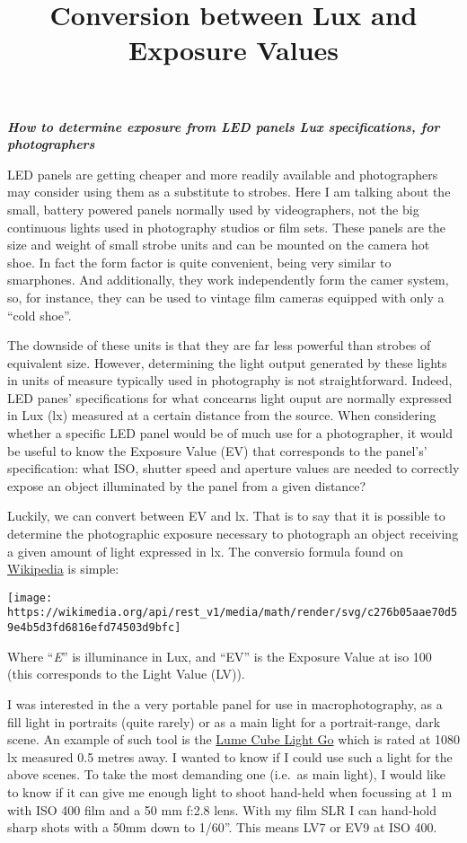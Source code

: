 \documentclass[
]{article}
\title{Conversion between Lux and Exposure Values}
\author{}
\date{\vspace{-2.5em}}
\begin{document}
\maketitle

\textbf{\emph{How to determine exposure from LED panels Lux
specifications, for photographers}}

LED panels are getting cheaper and more readily available and
photographers may consider using them as a substitute to strobes. Here I
am talking about the small, battery powered panels normally used by
videographers, not the big continuous lights used in photography studios
or film sets. These panels are the size and weight of small strobe units
and can be mounted on the camera hot shoe. In fact the form factor is
quite convenient, being very similar to smarphones. And additionally,
they work independently form the camer system, so, for instance, they
can be used to vintage film cameras equipped with only a ``cold shoe''.

The downside of these units is that they are far less powerful than
strobes of equivalent size. However, determining the light output
generated by these lights in units of measure typically used in
photography is not straightforward. Indeed, LED panes' specifications
for what concearns light ouput are normally expressed in Lux (lx)
measured at a certain distance from the source. When considering whether
a specific LED panel would be of much use for a photographer, it would
be useful to know the Exposure Value (EV) that corresponds to the
panel's' specification: what ISO, shutter speed and aperture values are
needed to correctly expose an object illuminated by the panel from a
given distance?

Luckily, we can convert between EV and lx. That is to say that it is
possible to determine the photographic exposure necessary to photograph
an object receiving a given amount of light expressed in lx. The
conversio formula found on
\href{http://en.wikipedia.org/wiki/Exposure_value\#EV_as_a_measure_of_luminance_and_illuminance}{Wikipedia}
is simple:

\texttt{[image: https://wikimedia.org/api/rest\_v1/media/math/render/svg/c276b05aae70d59e4b5d3fd6816efd74503d9bfc]}

Where ``\emph{E}'' is illuminance in Lux, and ``EV'' is the Exposure
Value at iso 100 (this corresponds to the Light Value (LV)).

I was interested in the a very portable panel for use in
macrophotography, as a fill light in portraits (quite rarely) or as a
main light for a portrait-range, dark scene. An example of such tool is
the \href{https://lumecube.com/products/panel-go}{Lume Cube Light Go}
which is rated at 1080 lx measured 0.5 metres away. I wanted to know if
I could use such a light for the above scenes. To take the most
demanding one (i.e.~as main light), I would like to know if it can give
me enough light to shoot hand-held when focussing at 1 m with ISO 400
film and a 50 mm f:2.8 lens. With my film SLR I can hand-hold sharp
shots with a 50mm down to 1/60''. This means LV7 or EV9 at ISO 400.
\end{document}
